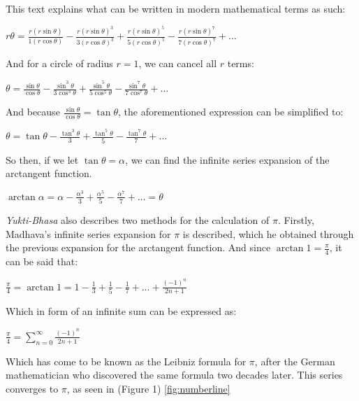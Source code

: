 

This text explains what can be written in modern mathematical terms as such:

$r \theta = \frac{r (r \sin{\theta})}{1 (r \cos{\theta})} - \frac{r (r \sin{\theta})^3}{3 (r \cos{\theta})^3} + \frac{r (r \sin{\theta})^5}{5 (r \cos{\theta})^5} - \frac{r (r \sin{\theta})^7}{7 (r \cos{\theta})^7} + \dots$

And for a circle of radius $r = 1$, we can cancel all $r$ terms:

$\theta = \frac{\sin{\theta}}{\cos{\theta}} - \frac{\sin^3{\theta}}{3 \cos^3{\theta}} + \frac{\sin^5{\theta}}{5 \cos^5{\theta}} - \frac{\sin^7{\theta}}{7 \cos^7{\theta}} + \dots$

And because $\frac{\sin{\theta}}{\cos{\theta}} = \tan{\theta}$, the aforementioned expression
can be simplified to:

$\theta = \tan{\theta} - \frac{\tan^3{\theta}}{3} + \frac{\tan^5{\theta}}{5} - \frac{\tan^7{\theta}}{7} + \dots$

So then, if we let $\tan{\theta} = \alpha$, we can find the infinite series expansion
of the arctangent function.

$\arctan{\alpha} = \alpha - \frac{\alpha^3}{3} + \frac{\alpha^5}{5} - \frac{\alpha^7}{7} + \dots = \theta$

\textit{Yukti-Bhasa} also describes two methods for the calculation of $\pi$. Firstly, Madhava's infinite series expansion for $\pi$ is described, which he obtained through the previous expansion for the arctangent function. And since $\arctan{1} = \frac{\pi}{4}$, it can be said that:

$\frac{\pi}{4} = \arctan{1} = 1 - \frac{1}{3} + \frac{1}{5} - \frac{1}{7} + \dots + \frac{(-1)^n}{2n +1}$

Which in form of an infinite sum can be expressed as:

$\frac{\pi}{4} = \sum\limits_{n=0}^\infty \frac{(-1)^n}{2n +1}$

Which has come to be known as the Leibniz formula for $\pi$, after the German mathematician who discovered the same formula two decades later. \cite{edwards_1994} This series converges to $\pi$, as seen in (Figure 1) \ref{fig:numberline}


